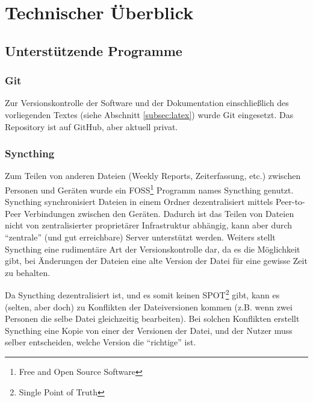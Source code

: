 
\chapter{Technischer Überblick}
\label{sec:ueberblick}


\section{Unterstützende Programme}
\label{subsec:ueberblick_programs}

\subsection{Git}
Zur Versionskontrolle der Software und der Dokumentation einschließlich des vorliegenden Textes
(siehe Abschnitt \ref{subsec:latex}) wurde Git eingesetzt.
%
Das Repository ist auf GitHub, aber aktuell privat.

\subsection{Syncthing}
Zum Teilen von anderen Dateien (Weekly Reports, Zeiterfassung, etc.) zwischen Personen und Geräten
wurde ein FOSS\footnote{Free and Open Source Software} Programm names Syncthing \cite{syncthing} genutzt.
%
Syncthing synchronisiert Dateien in einem Ordner dezentralisiert mittels Peer-to-Peer Verbindungen zwischen den Geräten.
%
Dadurch ist das Teilen von Dateien nicht von zentralisierter proprietärer Infrastruktur abhängig,
kann aber durch ``zentrale'' (und gut erreichbare) Server unterstützt werden.
%
Weiters stellt Syncthing eine rudimentäre Art der Versionskontrolle dar,
da es die Möglichkeit gibt,
bei Änderungen der Dateien eine alte Version der Datei für eine gewisse Zeit zu behalten.


Da Syncthing dezentralisiert ist,
und es somit keinen SPOT\footnote{Single Point of Truth} gibt,
kann es (selten, aber doch) zu Konflikten der Dateiversionen kommen (z.B. wenn zwei Personen die selbe Datei gleichzeitig bearbeiten). 
%
Bei solchen Konflikten erstellt Syncthing eine Kopie von einer der Versionen der Datei,
und der Nutzer muss selber entscheiden,
welche Version die ``richtige'' ist.

